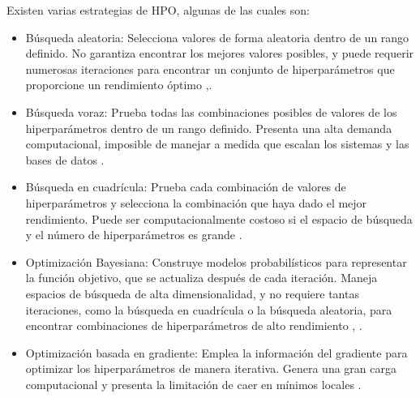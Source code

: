 Existen varias estrategias de HPO, algunas de las cuales son:
\begin{itemize}
	\item Búsqueda aleatoria: Selecciona valores de forma aleatoria dentro de un rango definido. No garantiza encontrar los mejores valores posibles, y puede requerir numerosas iteraciones para encontrar un conjunto de hiperparámetros que proporcione un rendimiento óptimo \citep{geron2022hands},\citep{zoller2021benchmark}.
	\item Búsqueda voraz: Prueba todas las combinaciones posibles de valores de los hiperparámetros dentro de un rango definido. Presenta una alta demanda computacional, imposible de manejar a medida que escalan los sistemas y las bases de datos \citep{zoller2021benchmark}.
	\item Búsqueda en cuadrícula: Prueba cada combinación de valores de hiperparámetros y selecciona la combinación que haya dado el mejor rendimiento. Puede ser computacionalmente costoso si el espacio de búsqueda y el número de hiperparámetros es grande \citep{he2021automl}.
	\item Optimización Bayesiana: Construye modelos probabilísticos para representar la función objetivo, que se actualiza después de cada iteración. Maneja espacios de búsqueda de alta dimensionalidad, y no requiere tantas iteraciones, como la búsqueda en cuadrícula o la búsqueda aleatoria, para encontrar combinaciones de hiperparámetros de alto rendimiento \citep{hutter2019automated}, \citep{he2021automl}.
	\item Optimización basada en gradiente: Emplea la información del gradiente para optimizar los hiperparámetros de manera iterativa. Genera una gran carga computacional y presenta la limitación de caer en mínimos locales \citep{zoller2021benchmark}.
\end{itemize} 


